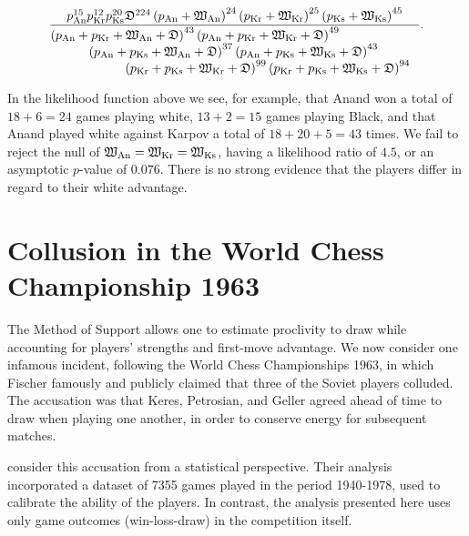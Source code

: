\documentclass[review]{elsarticle}
\begin{document}
\begin{equation}\label{KKA_personalised_whitemonster}
\frac{
p_\mathrm{An}^{15}
p_\mathrm{Kr}^{12}
p_\mathrm{Ks}^{20}
\draw^{224}
\left(p_\mathrm{An} + \white_\mathrm{An}\right)^{24}%
\left(p_\mathrm{Kr} + \white_\mathrm{Kr}\right)^{25}
\left(p_\mathrm{Ks} + \white_\mathrm{Ks}\right)^{45}
}{\parbox{4in}{$
\left(p_\mathrm{An} + p_\mathrm{Kr} + \white_\mathrm{An} +  \draw\right)^{43}
\left(p_\mathrm{An} + p_\mathrm{Kr} + \white_\mathrm{Kr} +  \draw\right)^{49}\\ \rule{10mm}{0mm}
\left(p_\mathrm{An} + p_\mathrm{Ks} + \white_\mathrm{An} +  \draw\right)^{37}
\left(p_\mathrm{An} + p_\mathrm{Ks} + \white_\mathrm{Ks} +  \draw\right)^{43}\\ \rule{20mm}{0mm}
\left(p_\mathrm{Kr} + p_\mathrm{Ks} + \white_\mathrm{Kr} +  \draw\right)^{99}
\left(p_\mathrm{Kr} + p_\mathrm{Ks} + \white_\mathrm{Ks} +  \draw\right)^{94}
$}}.
\end{equation}

In the likelihood function above we see, for example, that Anand won a
total of $18+6=24$ games playing white, $13+2=15$ games playing Black,
and that Anand played white against Karpov a total of $18+20+5=43$
times.  We fail to reject the null of
$\mathfrak{W}_\mathrm{An}=\mathfrak{W}_\mathrm{Kr}=\mathfrak{W}_\mathrm{Ks}$, having a
likelihood ratio of $4.5$, or an asymptotic $p$-value of $0.076$.
There is no strong evidence that the players differ in regard to their
white advantage.


\section{Collusion in the World Chess Championship 1963}

The Method of Support allows one to estimate proclivity to draw while
accounting for players' strengths and first-move advantage.  We now
consider one infamous incident, following the World Chess
Championships 1963, in which Fischer famously and publicly claimed
that three of the Soviet players colluded.  The accusation was that
Keres, Petrosian, and Geller agreed ahead of time to draw when playing
one another, in order to conserve energy for subsequent matches.

  \citet{moul2009} consider this accusation from a
  statistical perspective.  Their analysis incorporated a dataset of
  7355 games played in the period 1940-1978, used to calibrate the
  ability of the players.  In contrast, the analysis presented here
  uses only game outcomes (win-loss-draw) in the competition itself.
\end{document}
